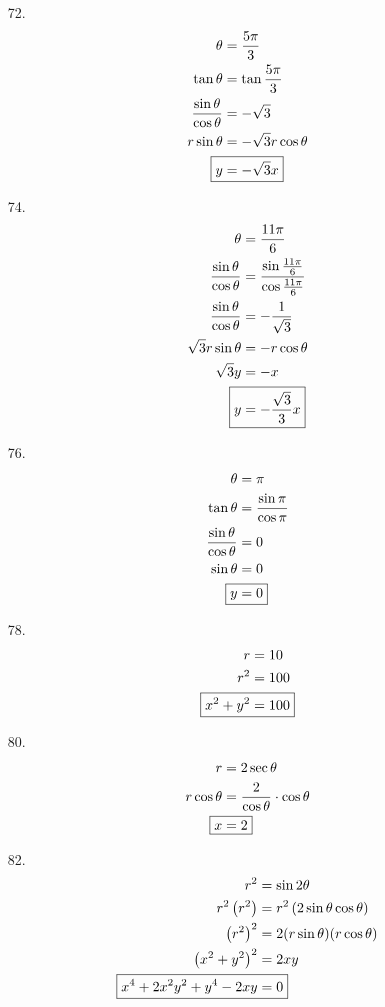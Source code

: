 \documentclass{article}
\begin{document}
\begin{multicols}{2}
\begin{itemize}
	\item[72.]
		\begin{align*}
			\theta&=\frac{5\pi}{3} \\
			\tan\theta&=\tan\frac{5\pi}{3} \\
			\frac{\sin\theta}{\cos\theta}&=-\sqrt{3} \\
			r\sin\theta&=-\sqrt{3}r\cos\theta \\
			\Aboxed{y&=-\sqrt{3}x}
		\end{align*}

	\item[74.]
		\begin{align*}
			\theta&=\frac{11\pi}{6} \\
			\frac{\sin\theta}{\cos\theta}&=\frac{\sin\frac{11\pi}{6}}{\cos\frac{11\pi}{6}} \\
			\frac{\sin\theta}{\cos\theta}&=-\frac{1}{\sqrt{3}} \\
			\sqrt{3}r\sin\theta&=-r\cos\theta \\
			\sqrt{3}y&=-x \\
			\Aboxed{y&=-\frac{\sqrt{3}}{3}x}
		\end{align*}

	\item[76.]
		\begin{align*}
			\theta&=\pi \\
			\tan\theta&=\frac{\sin\pi}{\cos\pi} \\
			\frac{\sin\theta}{\cos\theta}&=0 \\
			\sin\theta&=0 \\
			\Aboxed{y&=0}
		\end{align*}

	\item[78.]
		\begin{align*}
			r&=10 \\
			r^2&=100 \\
			\Aboxed{x^2+y^2&=100}
		\end{align*}

	\item[80.]
		\begin{align*}
			r&=2\sec\theta \\
			r\cos\theta&=\frac{2}{\cos\theta}\cdot\cos\theta \\
			\Aboxed{x&=2}
		\end{align*}

	\item[82.]
		\begin{align*}
			r^2&=\sin2\theta \\
			r^2\left(r^2\right)&=r^2\left(2\sin\theta\cos\theta\right) \\
			\left(r^2\right)^2&=2(r\sin\theta)(r\cos\theta) \\
			\left(x^2+y^2\right)^2&=2xy \\
			\Aboxed{x^4+2x^2y^2+y^4-2xy&=0}
		\end{align*}


\end{itemize}
\end{multicols}
\end{document}
